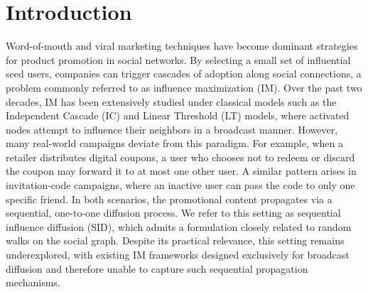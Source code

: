 \documentclass[sigconf]{acmart}
\begin{document}


\maketitle

\section{Introduction}
\label{sec:intro}
Word-of-mouth and viral marketing techniques have become dominant strategies for product promotion in social networks. By selecting a small set of influential seed users, companies can trigger cascades of adoption along social connections, a problem commonly referred to as influence maximization (IM). Over the past two decades, IM has been extensively studied under classical models such as the Independent Cascade (IC) and Linear Threshold (LT) models, where activated nodes attempt to influence their neighbors in a broadcast manner. However, many real-world campaigns deviate from this paradigm. For example, when a retailer distributes digital coupons, a user who chooses not to redeem or discard the coupon may forward it to at most one other user. A similar pattern arises in invitation-code campaigns, where an inactive user can pass the code to only one specific friend. In both scenarios, the promotional content propagates via a sequential, one-to-one diffusion process. We refer to this setting as sequential influence diffusion (SID), which admits a formulation closely related to random walks on the social graph. Despite its practical relevance, this setting remains underexplored, with existing IM frameworks designed exclusively for broadcast diffusion and therefore unable to capture such sequential propagation mechanisms.
\end{document}
